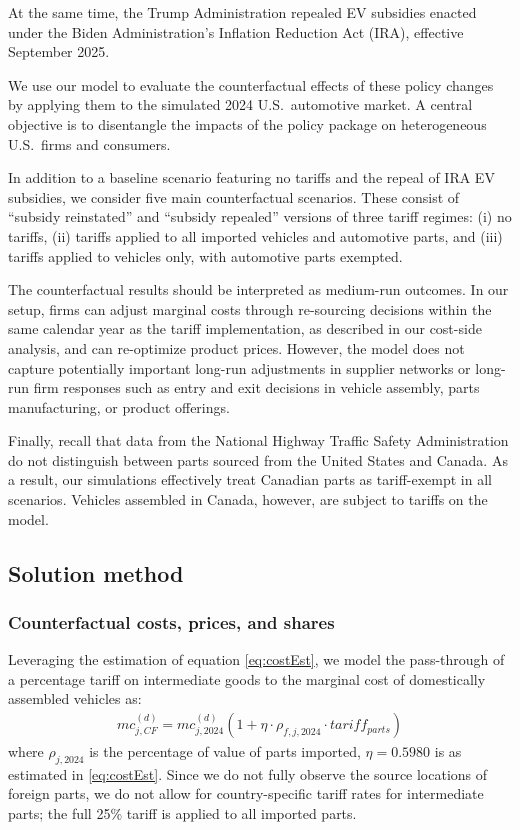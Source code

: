 \documentclass[11pt]{article}
\begin{document}
At the same time, the Trump Administration repealed EV subsidies enacted under the Biden Administration’s Inflation Reduction Act (IRA), effective September 2025.

We use our model to evaluate the counterfactual effects of these policy changes by applying them to the simulated 2024 U.S.\ automotive market. A central objective is to disentangle the impacts of the policy package on heterogeneous U.S.\ firms and consumers.

In addition to a baseline scenario featuring no tariffs and the repeal of IRA EV subsidies, we consider five main counterfactual scenarios. These consist of ``subsidy reinstated'' and ``subsidy repealed'' versions of three tariff regimes: (i) no tariffs, (ii) tariffs applied to all imported vehicles and automotive parts, and (iii) tariffs applied to vehicles only, with automotive parts exempted.

The counterfactual results should be interpreted as medium-run outcomes. In our setup, firms can adjust marginal costs through re-sourcing decisions within the same calendar year as the tariff implementation, as described in our cost-side analysis, and can re-optimize product prices. However,  the model does not capture potentially important long-run adjustments in supplier networks or long-run firm responses such as entry and exit decisions in vehicle assembly, parts manufacturing, or product offerings.

Finally, recall that data from the National Highway Traffic Safety Administration do not distinguish between parts sourced from the United States and Canada. As a result, our simulations effectively treat Canadian parts as tariff-exempt in all scenarios. Vehicles assembled in Canada, however, are subject to tariffs on the model.

\subsection{Solution method}

\subsubsection{Counterfactual costs, prices, and shares}

Leveraging the estimation of equation \eqref{eq:costEst}, we model the pass-through of a percentage tariff on intermediate goods to the marginal cost of domestically assembled vehicles as:
\begin{align}
    mc_{j,CF}^{(d)} = mc^{(d)}_{j,2024} (1+  \eta \cdot \rho_{f, j, 2024} \cdot  tariff_{parts})
\end{align}
\noindent where $\rho_{j,2024}$ is the percentage of value of parts imported, $\eta = 0.5980$ is as estimated in \eqref{eq:costEst}. Since we do not fully observe the source locations of foreign parts, we do not allow for country-specific tariff rates for intermediate parts; the full 25\% tariff is applied to all imported parts.
\end{document}
